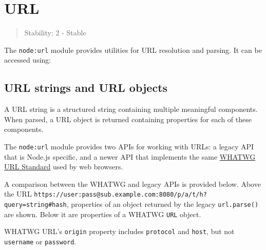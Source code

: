 \section{URL}\label{url}

\begin{quote}
Stability: 2 - Stable
\end{quote}

The \texttt{node:url} module provides utilities for URL resolution and
parsing. It can be accessed using:

\begin{Shaded}
\begin{Highlighting}[]
 \OperatorTok{;}
\end{Highlighting}
\end{Shaded}

\begin{Shaded}
\begin{Highlighting}[]
\OperatorTok{=} \NormalTok{(}\NormalTok{)}\OperatorTok{;}
\end{Highlighting}
\end{Shaded}

\subsection{URL strings and URL
objects}\label{url-strings-and-url-objects}

A URL string is a structured string containing multiple meaningful
components. When parsed, a URL object is returned containing properties
for each of these components.

The \texttt{node:url} module provides two APIs for working with URLs: a
legacy API that is Node.js specific, and a newer API that implements the
same \href{https://url.spec.whatwg.org/}{WHATWG URL Standard} used by
web browsers.

A comparison between the WHATWG and legacy APIs is provided below. Above
the URL
\texttt{\textquotesingle{}https://user:pass@sub.example.com:8080/p/a/t/h?query=string\#hash\textquotesingle{}},
properties of an object returned by the legacy \texttt{url.parse()} are
shown. Below it are properties of a WHATWG \texttt{URL} object.

WHATWG URL's \texttt{origin} property includes \texttt{protocol} and
\texttt{host}, but not \texttt{username} or \texttt{password}.

